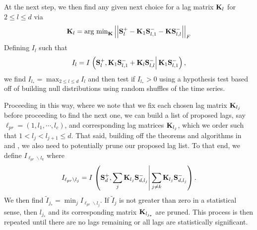 \documentclass[a4paper,11pt]{article}
\newcommand{\gnorm}[1]{\left|\left|#1\right|\right|}
\begin{document}
At the next step, we then find any given next choice for a lag matrix ${\bf K}_{l}$ for $2\leq l \leq d$ via 
\[
{\bf K}_{l} = \text{arg min}_{{\bf K}}\gnorm{{\bf S}^{+}_{l}-{\bf K}_{1}{\bf S}^{-}_{l,1}-{\bf K}{\bf S}^{-}_{l,l}}_{F}
\]
Defining $I_{l}$ such that 
\[
I_{l} = I\left.\left({\bf S}^{+}_{l}, {\bf K}_{1}{\bf S}^{-}_{l,1} + 
{\bf K}_{l}{\bf S}^{-}_{l,l}\right| {\bf K}_{1}{\bf S}^{-}_{l,1} \right),
\]
we find $I_{l_{\ast}} = \max_{2\leq l \leq d}I_{l}$ and then test if $I_{l_{\ast}}>0$ using a hypothesis test based off of building null distributions using random shuffles of the time series.   

Proceeding in this way, where we note that we fix each chosen lag matrix ${\bf K}_{l_{j}}$ before proceeding to find the next one, we can build a list of proposed lags, say $\ell_{pr} = (1, l_{1}, \cdots, l_{c})$, and corresponding lag matrices ${\bf K}_{l_{j}}$, which we order such that $1<l_{j}<l_{j+1}\leq d$.  That said, building off the theorems and algorithms in \cite{bollt} and \cite{bollt2}, we also need to potentially prune our proposed lag list.  To that end, we define $I_{\ell_{pr}\backslash l_{k}}$ where 
\[
I_{\ell_{pr}\backslash l_{j}} = I\left.\left({\bf S}^{+}_{d}, \sum_{j}{\bf K}_{l_{j}}{\bf S}^{-}_{d,l_{j}} \right| \sum_{j\neq k}{\bf K}_{l_{j}}{\bf S}^{-}_{d,l_{j}} \right).
\]
We then find $\tilde{I}_{j_{\ast}} = \min_{j}I_{\ell_{pr}\backslash l_{j}}$.  If $\tilde{I}_{j}$ is not greater than zero in a statistical sense, then $l_{j_{\ast}}$ and its corresponding matrix ${\bf K}_{l_{j_{\ast}}}$ are pruned.  This process is then repeated until there are no lags remaining or all lags are statistically significant.  



\end{document}
